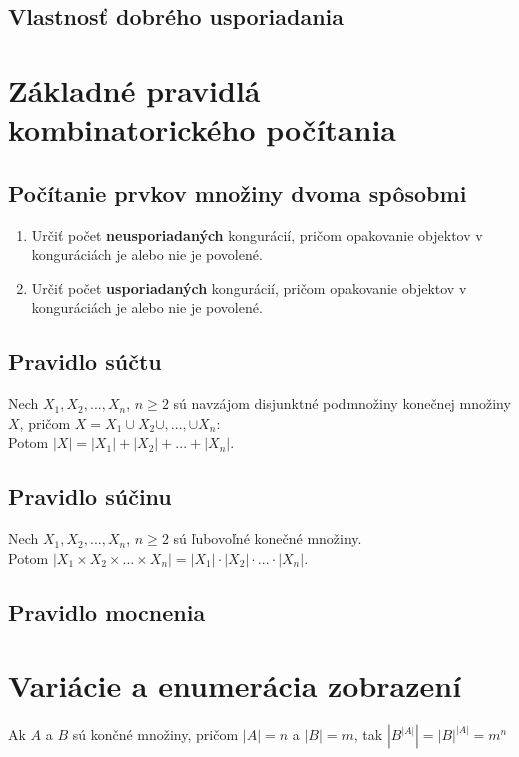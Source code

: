 	\subsection{Vlastnosť dobrého usporiadania}

\section {Základné pravidlá kombinatorického počítania}
	\subsection{Počítanie prvkov množiny dvoma spôsobmi}
		\begin{enumerate}
			\item Určiť počet \textbf{neusporiadaných} kongurácií, pričom opakovanie objektov v konguráciách je alebo nie je povolené.
			\item Určiť počet \textbf{usporiadaných} kongurácií, pričom opakovanie objektov v konguráciách je alebo nie je povolené.
		\end{enumerate}
	\subsection{Pravidlo súčtu}
		Nech $X_{1}, X_{2}, ...,  X_{n}$, $n \geq 2$ sú navzájom disjunktné podmnožiny konečnej množiny $X$, pričom $X = X_{1} \cup X_{2} \cup , ..., \cup X_{n}$: \\
		Potom $|X| = |X_{1}| + |X_{2}| + ... + |X_{n}|$.
	\subsection{Pravidlo súčinu}
		Nech $X_{1}, X_{2}, ...,  X_{n}$, $n \geq 2$ sú ľubovoľné konečné množiny.\\
		Potom $|X_{1} \times X_{2} \times ... \times X_{n}| = |X_{1}| \cdot |X_{2}| \cdot ... \cdot |X_{n}|$.

	\subsection{Pravidlo mocnenia}


\section {Variácie a enumerácia zobrazení}
    Ak $A$ a $B$ sú končné množiny, pričom $|A| = n$ a $|B| = m$, tak $|B^{|A|}| = |B|^{|A|} = m^{n}$\\

